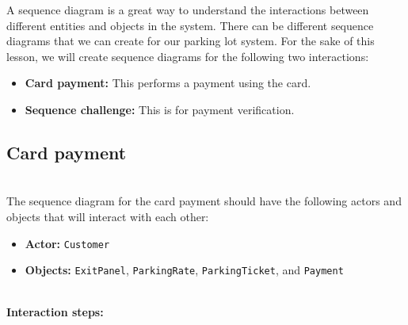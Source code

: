 

A sequence diagram is a great way to understand the interactions between different entities and objects in the system. There can be different sequence diagrams that we can create for our parking lot system. For the sake of this lesson, we will create sequence diagrams for the following two interactions:

\begin{itemize}
\item
\protect{}\label{Q9ZFL5rT1U-io5md9GJDc}
\textbf{Card payment:} This performs a payment using the card.
\item
\protect{}\label{Nei2nXZSDm3u0s1XMRyts}
\textbf{Sequence challenge:} This is for payment verification.
\end{itemize}

\subsection{Card payment}\label{jpqWa0MPFiqGmq2C5ewg4}
\\
The sequence diagram for the card payment should have the following actors and objects that will interact with each other:

\begin{itemize}
\item
\protect{}\label{Y4z8IKLV722WjGcQkDV8y}
\textbf{Actor:} \texttt{Customer}
\item
\protect{}\label{XR02gzAPsKqiBuwfVDxzU}
\textbf{Objects:} \texttt{ExitPanel}, \texttt{ParkingRate}, \texttt{ParkingTicket}, and \texttt{Payment}
\end{itemize}
\\
\textbf{Interaction steps:}

